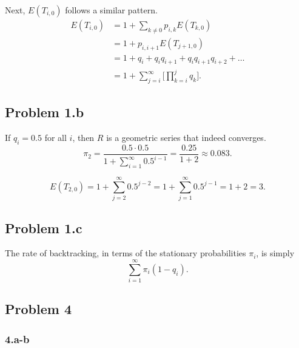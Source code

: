 \documentclass[letter]{article}
\begin{document}
Next, $E(T_{i,0})$ follows a similar pattern. 
\begin{equation*}
  \begin{aligned}
      E(T_{i,0}) &= 1 + \sum_{k \ne 0}{p_{i,k}E(T_{k,0})} \\ 
                 &= 1 + p_{i,i+1}E(T_{j+1,0}) \\
                 &= 1 + q_i + q_iq_{i+1} + q_iq_{i+1}q_{i+2} + \dots \\
                 &= 1 + \sum_{j=i}^\infty{\Big[ \prod_{k=i}^{j}{q_k} \Big]}.
  \end{aligned}
\end{equation*}


\subsection*{Problem 1.b}
If $q_i = 0.5$ for all $i$, then $R$ is a geometric series that indeed converges. 
$$ \pi_2 = \frac{0.5 \cdot 0.5}{1 + \sum_{i=1}^\infty{0.5^{i-1}}} = 
           \frac{0.25}{1+2} \approx 0.083. $$

$$ E(T_{2,0}) = 1 + \sum_{j=2}^\infty{0.5^{j-2}} 
              = 1 + \sum_{j=1}^\infty{0.5^{j-1}} = 1 + 2 = 3. $$

\subsection*{Problem 1.c}
The rate of backtracking, in terms of the stationary probabilities $\pi_i$, is simply
$$ \sum_{i=1}^\infty{\pi_i(1 - q_i)}. $$


\subsection*{Problem 4}

\subsubsection*{4.a-b}
\end{document}
